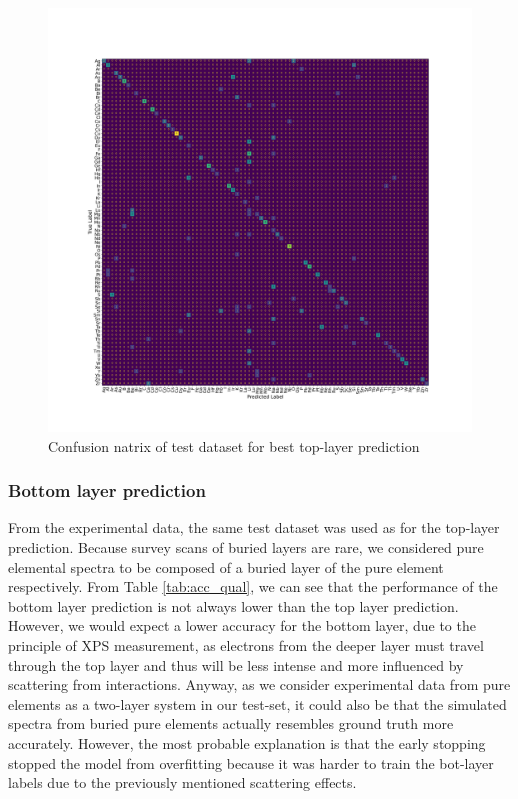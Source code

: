 \begin{center}
\begin{figure}[H]
        \centerline{\includegraphics[width=1.4\textwidth]{Figures/best_task_1_model_CM.png}}
    \centering
    \caption[width=1.4\textwidth]{Confusion natrix of test dataset for best top-layer prediction}
    \label{cm_cnn_1l}
\end{figure}
\end{center}



\subsubsection{Bottom layer prediction}


From the experimental data, the same test dataset was used as for the top-layer prediction. Because survey scans of buried layers are rare, we considered pure elemental spectra to be composed of a buried layer of the pure element respectively.
From Table \ref{tab:acc_qual}, we can see that the performance of the bottom layer prediction is not always lower than the top layer prediction. However, we would expect a lower accuracy for the bottom layer, due to the principle of XPS measurement, as electrons from the deeper layer must travel through the top layer and thus will be less intense and more influenced by scattering from interactions. Anyway, as we consider experimental data from pure elements as a two-layer system in our test-set, it could also be that the simulated spectra from buried pure elements actually resembles ground truth more accurately. However, the most probable explanation is that the early stopping stopped the model from overfitting because it was harder to train the bot-layer labels due to the previously mentioned scattering effects.




